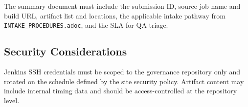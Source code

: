 The summary document must include the submission ID, source job name and build URL,
artifact list and locations, the applicable intake pathway from
\texttt{INTAKE\_PROCEDURES.adoc}, and the SLA for QA triage.

\subsection{Security Considerations}

Jenkins SSH credentials must be scoped to the governance repository only and rotated
on the schedule defined by the site security policy. Artifact content may include
internal timing data and should be access-controlled at the repository level.

